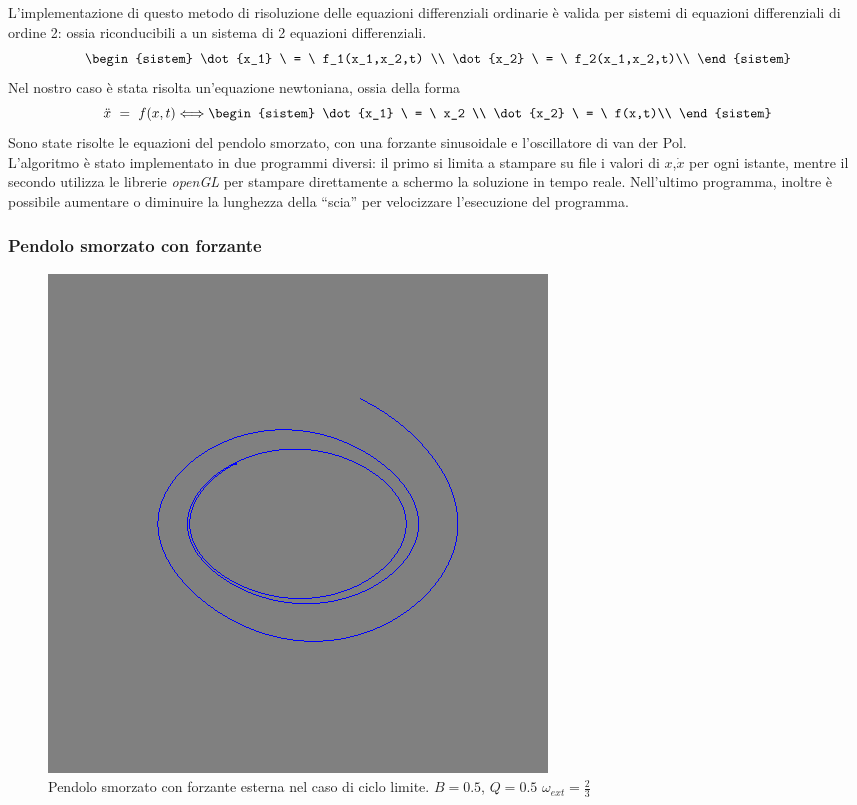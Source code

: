 L'implementazione di questo metodo di risoluzione delle equazioni differenziali ordinarie è valida
per sistemi di equazioni differenziali di ordine 2: ossia riconducibili a un sistema di 2 equazioni differenziali.\\
$$\begin{sistem}
	\dot{x_1} \ = \ f_1(x_1,x_2,t) \\
	\dot{x_2} \ = \ f_2(x_1,x_2,t)\\
  \end{sistem}
$$
Nel nostro caso è stata risolta un'equazione newtoniana, ossia della forma
$$
	\ddot{x} \ = \ f(x,t) \Longleftrightarrow  
	\begin{sistem}
	\dot{x_1} \ = \ x_2 \\
	\dot{x_2} \ = \ f(x,t)\\
	\end{sistem}
$$
Sono state risolte le equazioni del pendolo smorzato, con una forzante sinusoidale e l'oscillatore di van der Pol.\\
L'algoritmo è stato implementato in due programmi diversi: il primo si limita a stampare su file i valori di $x$,$\dot x$ per ogni istante, mentre
il secondo utilizza le librerie \emph{openGL} per stampare direttamente a schermo la soluzione in tempo reale.
Nell'ultimo programma, inoltre è possibile aumentare o diminuire la lunghezza della ``scia'' per velocizzare l'esecuzione del programma.
\subsubsection{Pendolo smorzato con forzante}
\begin{figure}[!h]
  \centering
  \includegraphics[width = 0.5\columnwidth]{pendolo_limite.png}
  \caption{Pendolo smorzato con forzante esterna nel caso di ciclo limite. $B = 0.5$, $Q= 0.5$ $\omega_{ext} = \tfrac{2}{3}$}
 \end{figure}


